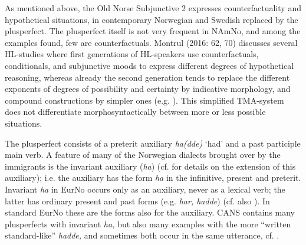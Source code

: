 \documentclass[output=paper]{langscibook}
\begin{document}
As mentioned above, the Old Norse Subjunctive 2 expresses counterfactuality and hypothetical situations, in contemporary Norwegian and Swedish replaced by the plusperfect. The plusperfect itself is not very frequent in NAmNo, and among the examples found, few are counterfactuals. Montrul (2016: 62, 70) discusses several HL-studies where first generations of HL-speakers use counterfactuals, conditionals, and subjunctive moods to express different degrees of hypothetical reasoning, whereas already the second generation tends to replace the different exponents of degrees of possibility and certainty by indicative morphology, and compound constructions by simpler ones (e.g. \citealt{SilvaCorvalan1994}). This simplified TMA-system does not differentiate morphosyntactically between more or less possible situations. 

The plusperfect consists of a preterit auxiliary \textit{ha(dde)} ‘had’ and a past participle main verb. A feature of many of the Norwegian dialects brought over by the immigrants is the invariant auxiliary (\textit{ha}) (cf. \citealt{Eide2021} for details on the extension of this auxiliary); i.e. the auxiliary has the form \textit{ha} in the infinitive, present and preterit. Invariant \textit{ha} in EurNo occurs only as an auxiliary, never as a lexical verb; the latter has ordinary present and past forms (e.g. \textit{har, hadde}) (cf. also ). In standard EurNo these are the forms also for the auxiliary. CANS contains many plusperfects with invariant \textit{ha,} but also many examples with the more “written standard-like” \textit{hadde,} and sometimes both occur in the same utterance, cf. . 
\end{document}
